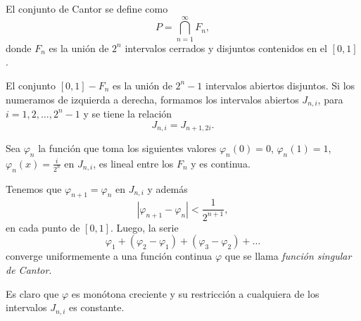 El conjunto de Cantor se define como 
\[
P=\bigcap\limits_{n=1}^{\infty} F_n,
\]
donde $F_n$ es la uni\'on de $2^n$ intervalos cerrados y disjuntos contenidos en el $[0,1]$.

El conjunto $[0,1]-F_n$ es la uni\'on de $2^n-1$ intervalos abiertos disjuntos. Si los numeramos de izquierda a derecha, formamos los intervalos abiertos $J_{n,i}$, para $i=1,2,\ldots, 2^n-1$ y se tiene la relaci\'on
\[ 
J_{n,i}=J_{n+1,2i}.
\]

Sea $\varphi_n$ la funci\'on que toma los siguientes valores
$\varphi_n(0)=0$, $\varphi_n(1)=1$, $\varphi_n(x)=\frac{i}{2^n}$ en $J_{n,i}$, es lineal entre los $F_n$ y es continua.

Tenemos que $\varphi_{n+1}=\varphi_n$ en  $J_{n,i}$   y adem\'as
\[
\left|\varphi_{n+1} -\varphi_n\right|<\frac{1}{2^{n+1}},
\]
en cada punto de $[0,1]$.
Luego, la serie
\[
\varphi_1+(\varphi_2-\varphi_1)+(\varphi_3-\varphi_2)+\ldots
\]
converge uniformemente a una funci\'on continua $\varphi$ que se llama 
\emph{funci\'on singular de Cantor}. 

Es claro que $\varphi$ es mon\'otona creciente y su restricci\'on a cualquiera de los intervalos $J_{n,i}$ es constante.

